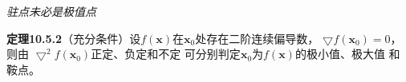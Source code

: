 \begin{center}
	\quad
	
	{\it 驻点未必是极值点}
\end{center}

{\bf 定理10.5.2}（充分条件）设$f(\bm{x})$在$\bm{x}_0$处存在二阶连续偏导数，
$\bigtriangledown f(\bm{x}_0)=0$，则由
$\bigtriangledown^2 f(\bm{x}_0)$正定、负定和不定
可分别判定$\bm{x}_0$为$f(\bm{x})$的极小值、极大值
和鞍点。


